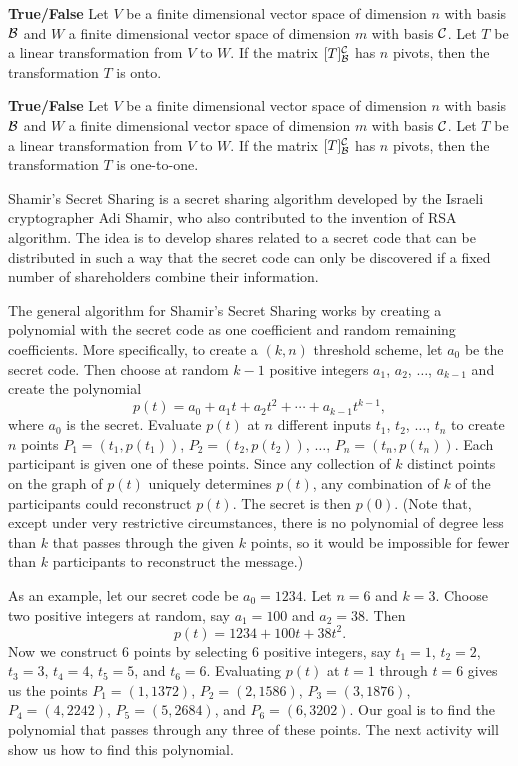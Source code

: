 \item \textbf{True/False}  Let $V$ be a finite dimensional vector space of dimension $n$ with basis $\mathcal{B}$ and $W$ a finite dimensional vector space of dimension $m$ with basis $\mathcal{C}$. Let $T$ be a linear transformation from $V$ to $W$. If the matrix $[T]_{\mathcal{B}}^{\mathcal{C}}$ has $n$ pivots, then the transformation $T$ is onto.

\item \textbf{True/False} Let $V$ be a finite dimensional vector space of dimension $n$ with basis $\mathcal{B}$ and $W$ a finite dimensional vector space of dimension $m$ with basis $\mathcal{C}$. Let $T$ be a linear transformation from $V$ to $W$. If the matrix $[T]_{\mathcal{B}}^{\mathcal{C}}$ has $n$ pivots, then the transformation $T$ is one-to-one.

	\ea


\ee


Shamir's Secret Sharing is a secret sharing algorithm developed by the Israeli cryptographer Adi Shamir, who also contributed to the invention of RSA algorithm. The idea is to develop shares related to a secret code that can be distributed in such a way that the secret code can only be discovered if a fixed number of shareholders combine their information. 

The general algorithm for Shamir's Secret Sharing works by creating a polynomial with the secret code as one coefficient and random remaining coefficients. More specifically, to create a $(k,n)$ threshold scheme, let $a_0$ be the secret code. Then choose at random $k-1$ positive integers $a_1$, $a_2$, $\ldots$, $a_{k-1}$ and create the polynomial
\[p(t) = a_0 + a_1t + a_2 t^2 + \cdots + a_{k-1}t^{k-1},\]
where $a_0$ is the secret. Evaluate $p(t)$ at $n$ different inputs $t_1$, $t_2$, $\ldots$, $t_n$ to create $n$ points $P_1 = (t_1,p(t_1))$, $P_2 = (t_2,p(t_2))$, $\ldots$, $P_n = (t_n, p(t_n))$. Each participant is given one of these points. Since any collection of $k$ distinct points on the graph of $p(t)$ uniquely determines $p(t)$, any combination of $k$ of the participants could reconstruct $p(t)$. The secret is then $p(0)$. (Note that, except under very restrictive circumstances, there is no polynomial of degree less than $k$ that passes through the given $k$ points, so it would be impossible for fewer than $k$ participants to reconstruct the message.) 

As an example, let our secret code be $a_0=1234$. Let $n = 6$ and $k = 3$. Choose two positive integers at random, say $a_1 = 100$ and $a_2 = 38$. Then
\begin{equation} \label{eq:SSS_polynomial}
p(t) = 1234 + 100t + 38t^2.
\end{equation}
Now we construct $6$ points by selecting $6$ positive integers, say $t_1 = 1$, $t_2 = 2$, $t_3 = 3$, $t_4 = 4$, $t_5 = 5$, and $t_6 = 6$. Evaluating $p(t)$ at $t=1$ through $t=6$ gives us the points $P_1 = (1,1372)$, $P_2 = (2,1586)$, $P_3 = (3,1876)$, $P_4 = (4,2242)$, $P_5 = (5,2684)$, and $P_6 = (6,3202)$. Our goal is to find the polynomial that passes through any three of these points. The next activity will show us how to find this polynomial.

